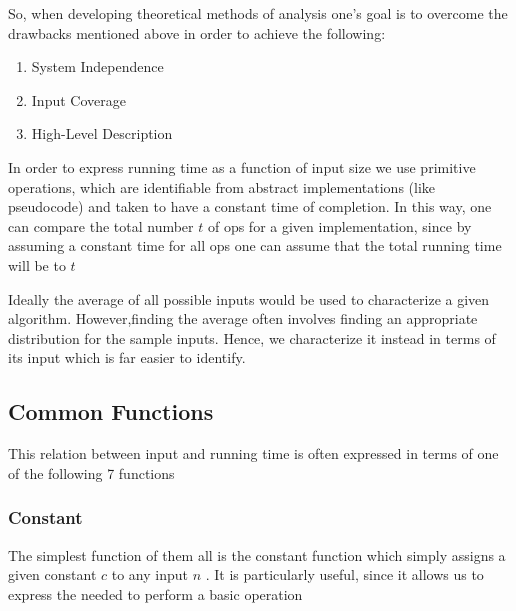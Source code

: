 \par{So, when developing theoretical methods of analysis one's goal is to overcome the drawbacks mentioned above in order to achieve the following:}

\begin{enumerate}
	\item System Independence
	\item Input Coverage
	\item High-Level Description
\end{enumerate}



\par{In order to express running time as a function of input size we use primitive operations, which are identifiable from abstract implementations (like
pseudocode) and taken to have a constant time of completion. In this way, one can compare the total number $t$ of ops for a given implementation, since by
assuming a constant time for all ops one can assume that the total running time will be  to $t$}

\par{Ideally the average of all possible inputs would be used to characterize a given algorithm. However,finding the average often involves finding an
		appropriate distribution for the sample inputs. Hence, we characterize it instead in terms of its  input which is far easier to
		identify. }

\subsection{Common Functions}

\par{This relation between input and running time is often expressed in terms of one of the following 7 functions}

\subsubsection{Constant}

	\par{The simplest function of them all is the constant function which simply
	assigns a given constant $c$ to any input $n$ . It is particularly useful,
	since it allows us to express the  needed to perform a basic
	operation}


